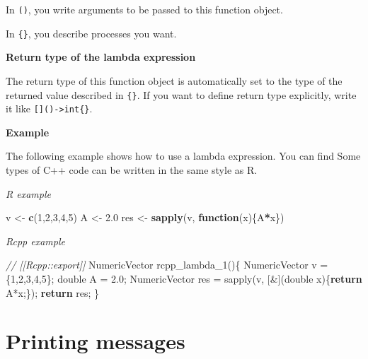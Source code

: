 \documentclass[
]{book}
\newenvironment{Shaded}{\begin{snugshade}}{\end{snugshade}}
\newcommand{\CommentTok}[1]{\textcolor[rgb]{0.56,0.35,0.01}{\textit{#1}}}
\newcommand{\ControlFlowTok}[1]{\textcolor[rgb]{0.13,0.29,0.53}{\textbf{#1}}}
\newcommand{\DataTypeTok}[1]{\textcolor[rgb]{0.13,0.29,0.53}{#1}}
\newcommand{\DecValTok}[1]{\textcolor[rgb]{0.00,0.00,0.81}{#1}}
\newcommand{\FloatTok}[1]{\textcolor[rgb]{0.00,0.00,0.81}{#1}}
\newcommand{\KeywordTok}[1]{\textcolor[rgb]{0.13,0.29,0.53}{\textbf{#1}}}
\newcommand{\NormalTok}[1]{#1}
\newcommand{\OperatorTok}[1]{\textcolor[rgb]{0.81,0.36,0.00}{\textbf{#1}}}
\newcommand{\StringTok}[1]{\textcolor[rgb]{0.31,0.60,0.02}{#1}}
\begin{document}
In \texttt{()}, you write arguments to be passed to this function object.

In \texttt{\{\}}, you describe processes you want.

\textbf{Return type of the lambda expression}

The return type of this function object is automatically set to the type of the returned value described in \texttt{\{\}}. If you want to define return type explicitly, write it like \texttt{{[}{]}()-\textgreater{}int\{\}}.

\textbf{Example}

The following example shows how to use a lambda expression. You can find Some types of C++ code can be written in the same style as R.

\emph{R example}

\begin{Shaded}
\begin{Highlighting}[]
\NormalTok{v <-}\StringTok{ }\KeywordTok{c}\NormalTok{(}\DecValTok{1}\NormalTok{,}\DecValTok{2}\NormalTok{,}\DecValTok{3}\NormalTok{,}\DecValTok{4}\NormalTok{,}\DecValTok{5}\NormalTok{)}
\NormalTok{A <-}\StringTok{ }\FloatTok{2.0}
\NormalTok{res <-}
\StringTok{  }\KeywordTok{sapply}\NormalTok{(v, }\ControlFlowTok{function}\NormalTok{(x)\{A}\OperatorTok{*}\NormalTok{x\})}
\end{Highlighting}
\end{Shaded}

\emph{Rcpp example}

\begin{Shaded}
\begin{Highlighting}[]
\CommentTok{// [[Rcpp::export]]}
\NormalTok{NumericVector rcpp_lambda_1()\{}
\NormalTok{  NumericVector v = \{}\DecValTok{1}\NormalTok{,}\DecValTok{2}\NormalTok{,}\DecValTok{3}\NormalTok{,}\DecValTok{4}\NormalTok{,}\DecValTok{5}\NormalTok{\};}
  \DataTypeTok{double}\NormalTok{ A = }\FloatTok{2.0}\NormalTok{;}
\NormalTok{  NumericVector res =}
\NormalTok{    sapply(v, [&](}\DataTypeTok{double}\NormalTok{ x)\{}\ControlFlowTok{return}\NormalTok{ A*x;\});}
  \ControlFlowTok{return}\NormalTok{ res;}
\NormalTok{\}}
\end{Highlighting}
\end{Shaded}

\hypertarget{printing-messages}{%
\chapter{Printing messages}\label{printing-messages}}
\end{document}
